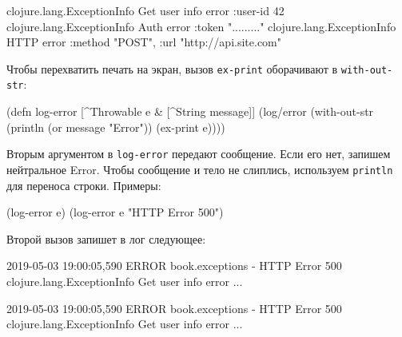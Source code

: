 \else

\begin{english}
  \begin{clojure}
clojure.lang.ExceptionInfo
  Get user info error
  {:user-id 42}
clojure.lang.ExceptionInfo
  Auth error
  {:token "........."}
clojure.lang.ExceptionInfo
  HTTP error
  {:method "POST", :url "http://api.site.com"}
  \end{clojure}
\end{english}

\fi


Чтобы перехватить печать на экран, вызов \verb|ex-print| оборачивают в
\verb|with-out-str|:

\begin{english}
  \begin{clojure}
(defn log-error
  [^Throwable e & [^String message]]
  (log/error
   (with-out-str
     (println (or message "Error"))
     (ex-print e))))
  \end{clojure}
\end{english}

Вторым аргументом в \verb|log-error| передают сообщение. Если его нет, запишем
нейтральное Error. Чтобы сообщение и тело не слиплись, используем
\verb|println| для переноса строки. Примеры:

\begin{english}
  \begin{clojure}
(log-error e)
(log-error e "HTTP Error 500")
  \end{clojure}
\end{english}

Второй вызов запишет в лог следующее:

\ifx\DEVICETYPE\MOBILE

\begin{english}
  \begin{text}
2019-05-03 19:00:05,590 ERROR
book.exceptions - HTTP Error 500
clojure.lang.ExceptionInfo
  Get user info error
  ...
  \end{text}
\end{english}

\else

\begin{english}
  \begin{text}
2019-05-03 19:00:05,590 ERROR book.exceptions - HTTP Error 500
clojure.lang.ExceptionInfo
  Get user info error
  ...
  \end{text}
\end{english}

